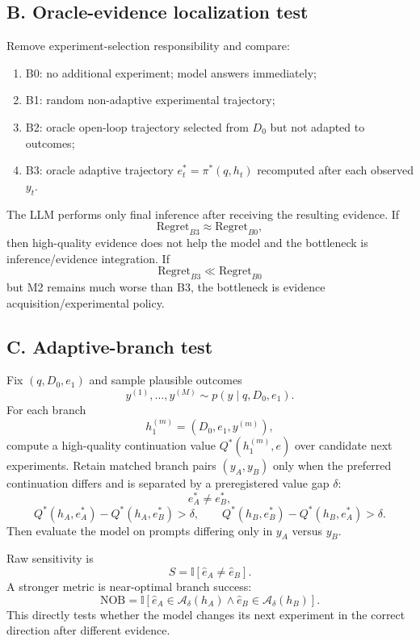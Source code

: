 \documentclass[11pt]{article}
\newcommand{\A}{\mathcal{A}}
\newcommand{\ind}{\mathbb{I}}
\begin{document}
\subsection{B. Oracle-evidence localization test}
Remove experiment-selection responsibility and compare:
\begin{enumerate}
    \item B0: no additional experiment; model answers immediately;
    \item B1: random non-adaptive experimental trajectory;
    \item B2: oracle open-loop trajectory selected from $D_0$ but not adapted to outcomes;
    \item B3: oracle adaptive trajectory $e_t^*=\pi^*(q,h_t)$ recomputed after each observed $y_t$.
\end{enumerate}
The LLM performs only final inference after receiving the resulting evidence. If
\[
\mathrm{Regret}_{B3}\approx\mathrm{Regret}_{B0},
\]
then high-quality evidence does not help the model and the bottleneck is inference/evidence integration. If
\[
\mathrm{Regret}_{B3}\ll\mathrm{Regret}_{B0}
\]
but M2 remains much worse than B3, the bottleneck is evidence acquisition/experimental policy.

\subsection{C. Adaptive-branch test}
Fix $(q,D_0,e_1)$ and sample plausible outcomes
\[
y^{(1)},\ldots,y^{(M)}\sim p(y\mid q,D_0,e_1).
\]
For each branch
\[
h_1^{(m)}=(D_0,e_1,y^{(m)}),
\]
compute a high-quality continuation value $Q^*(h_1^{(m)},e)$ over candidate next experiments. Retain matched branch pairs $(y_A,y_B)$ only when the preferred continuation differs and is separated by a preregistered value gap $\delta$:
\[
e_A^*\neq e_B^*,
\]
\[
Q^*(h_A,e_A^*)-Q^*(h_A,e_B^*)>\delta,
\qquad
Q^*(h_B,e_B^*)-Q^*(h_B,e_A^*)>\delta.
\]
Then evaluate the model on prompts differing only in $y_A$ versus $y_B$.

Raw sensitivity is
\[
S=\ind[\widehat e_A\neq\widehat e_B].
\]
A stronger metric is near-optimal branch success:
\[
\mathrm{NOB}
=\ind[
\widehat e_A\in\A_\delta(h_A)
\land
\widehat e_B\in\A_\delta(h_B)
].
\]
This directly tests whether the model changes its next experiment in the correct direction after different evidence.
\end{document}
